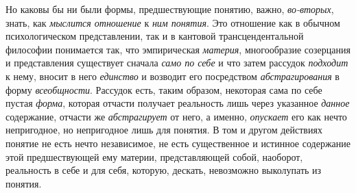 \documentclass[twoside]{article}
\begin{document}
{{Но каковы бы ни были формы, предшествующие понятию, важно,
{\em во-вторых}, знать,
как {\em мыслится отношение}
к {\em ним понятия}.
Это отношение как в обычном психологическом представлении,
так и в кантовой трансцендентальной философии понимается так, что
эмпирическая {\em материя},
многообразие созерцания и представления существует сначала
{\em само по себе} и что
затем рассудок {\em подходит}
к нему, вносит в него
{\em единство} и возводит
его посредством {\em абстрагирования}
в форму
{\em всеобщности}.
Рассудок есть, таким образом, некоторая сама
по себе пустая {\em форма},
которая отчасти получает реальность лишь через указанное
{\em данное} содержание,
отчасти же {\em абстрагирует}
от него, а именно,
{\em опускает} его как
нечто непригодное, но непригодное лишь для понятия. В том и другом
действиях понятие не есть нечто независимое, не есть существенное и
истинное содержание этой предшествующей ему материи, представляющей собой,
наоборот, реальность в себе и для себя, которую, дескать, невозможно
выколупать из понятия.

}}
\end{document}
